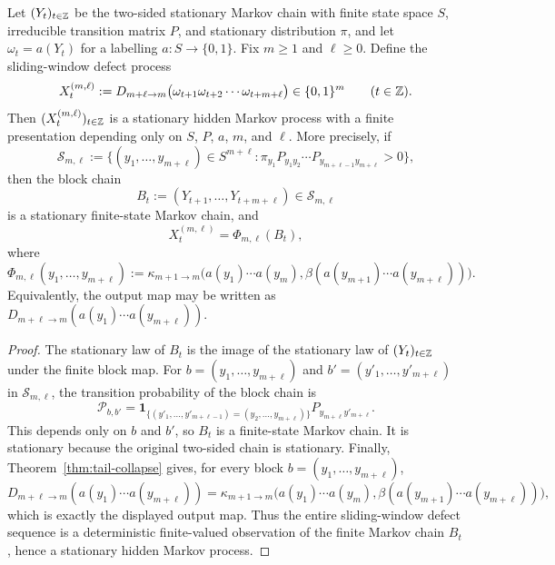 \begin{corollary}
\label{cor:sliding-window-hidden-markov}
Let $(Y_t)_{t\in\mathbb{Z}}$ be the two-sided stationary Markov chain with finite
state space $S$, irreducible transition matrix $P$, and stationary distribution
$\pi$, and let $\omega_t=a(Y_t)$ for a labelling $a:S\to\{0,1\}$.  Fix
$m\ge 1$ and $\ell\ge 0$.  Define the sliding-window defect process
\[
X_t^{(m,\ell)}
:=
D_{m+\ell\to m}\bigl(\omega_{t+1}\omega_{t+2}\cdots\omega_{t+m+\ell}\bigr)
\in\{0,1\}^m
\qquad(t\in\mathbb{Z}).
\]
Then $(X_t^{(m,\ell)})_{t\in\mathbb{Z}}$ is a stationary hidden Markov process with a
finite presentation depending only on $S$, $P$, $a$, $m$, and $\ell$.  More
precisely, if
\[
\mathcal S_{m,\ell}
:=
\{(y_1,\dots,y_{m+\ell})\in S^{m+\ell}:
\pi_{y_1}P_{y_1y_2}\cdots P_{y_{m+\ell-1}y_{m+\ell}}>0\},
\]
then the block chain
\[
B_t:=(Y_{t+1},\dots,Y_{t+m+\ell})\in\mathcal S_{m,\ell}
\]
is a stationary finite-state Markov chain, and
\[
X_t^{(m,\ell)}=
\Phi_{m,\ell}(B_t),
\]
where
\[
\Phi_{m,\ell}(y_1,\dots,y_{m+\ell})
:=
\kappa_{m+1\to m}
\bigl(a(y_1)\cdots a(y_m),
\beta(a(y_{m+1})\cdots a(y_{m+\ell}))\bigr).
\]
Equivalently, the output map may be written as
$D_{m+\ell\to m}(a(y_1)\cdots a(y_{m+\ell}))$.
\end{corollary}

\begin{proof}
The stationary law of $B_t$ is the image of the stationary law of
$(Y_t)_{t\in\mathbb{Z}}$ under the finite block map.  For
$b=(y_1,\dots,y_{m+\ell})$ and $b'=(y'_1,\dots,y'_{m+\ell})$ in
$\mathcal S_{m,\ell}$, the transition probability of the block chain is
\[
\mathcal P_{b,b'}
=
\mathbf 1_{\{(y'_1,\dots,y'_{m+\ell-1})=(y_2,\dots,y_{m+\ell})\}}
P_{y_{m+\ell}y'_{m+\ell}}.
\]
This depends only on $b$ and $b'$, so $B_t$ is a finite-state Markov chain.
It is stationary because the original two-sided chain is stationary.  Finally,
Theorem~\ref{thm:tail-collapse} gives, for every block $b=(y_1,\dots,y_{m+\ell})$,
\[
D_{m+\ell\to m}(a(y_1)\cdots a(y_{m+\ell}))
=
\kappa_{m+1\to m}
\bigl(a(y_1)\cdots a(y_m),
\beta(a(y_{m+1})\cdots a(y_{m+\ell}))\bigr),
\]
which is exactly the displayed output map.  Thus the entire sliding-window
defect sequence is a deterministic finite-valued observation of the finite
Markov chain $B_t$, hence a stationary hidden Markov process.
\end{proof}
